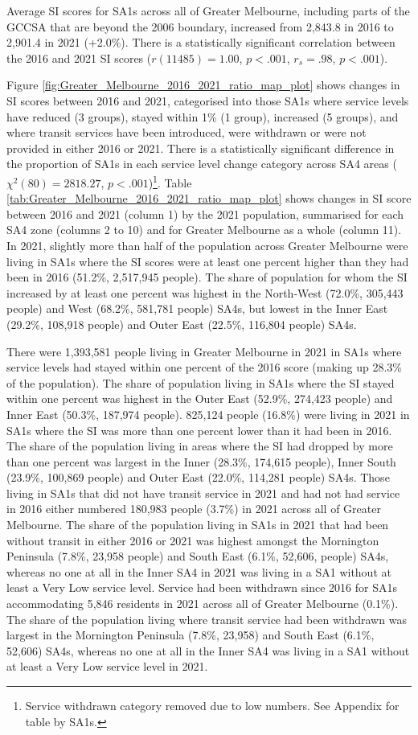 \documentclass[preprint, 3p,
authoryear]{elsarticle} %
\begin{document}
Average SI scores for SA1s across all of Greater Melbourne, including
parts of the GCCSA that are beyond the 2006 boundary, increased from
2,843.8 in 2016 to 2,901.4 in 2021 (+2.0\%). There is a statistically
significant correlation between the 2016 and 2021 SI scores
(\(r(11485) = 1.00\), \(p < .001\), \(r_s =.98\), \(p < .001\)).

Figure \ref{fig:Greater_Melbourne_2016_2021_ratio_map_plot} shows
changes in SI scores between 2016 and 2021, categorised into those SA1s
where service levels have reduced (3 groups), stayed within 1\% (1
group), increased (5 groups), and where transit services have been
introduced, were withdrawn or were not provided in either 2016 or 2021.
There is a statistically significant difference in the proportion of
SA1s in each service level change category across SA4 areas
(\(\chi^2(80) = 2818.27\), \(p < .001\))\footnote{Service withdrawn
  category removed due to low numbers. See Appendix for table by SA1s.}.
Table \ref{tab:Greater_Melbourne_2016_2021_ratio_map_plot} shows changes
in SI score between 2016 and 2021 (column 1) by the 2021 population,
summarised for each SA4 zone (columns 2 to 10) and for Greater Melbourne
as a whole (column 11). In 2021, slightly more than half of the
population across Greater Melbourne were living in SA1s where the SI
scores were at least one percent higher than they had been in 2016
(51.2\%, 2,517,945 people). The share of population for whom the SI
increased by at least one percent was highest in the North-West (72.0\%,
305,443 people) and West (68.2\%, 581,781 people) SA4s, but lowest in
the Inner East (29.2\%, 108,918 people) and Outer East (22.5\%, 116,804
people) SA4s.

There were 1,393,581 people living in Greater Melbourne in 2021 in SA1s
where service levels had stayed within one percent of the 2016 score
(making up 28.3\% of the population). The share of population living in
SA1s where the SI stayed within one percent was highest in the Outer
East (52.9\%, 274,423 people) and Inner East (50.3\%, 187,974 people).
825,124 people (16.8\%) were living in 2021 in SA1s where the SI was
more than one percent lower than it had been in 2016. The share of the
population living in areas where the SI had dropped by more than one
percent was largest in the Inner (28.3\%, 174,615 people), Inner South
(23.9\%, 100,869 people) and Outer East (22.0\%, 114,281 people) SA4s.
Those living in SA1s that did not have transit service in 2021 and had
not had service in 2016 either numbered 180,983 people (3.7\%) in 2021
across all of Greater Melbourne. The share of the population living in
SA1s in 2021 that had been without transit in either 2016 or 2021 was
highest amongst the Mornington Peninsula (7.8\%, 23,958 people) and
South East (6.1\%, 52,606, people) SA4s, whereas no one at all in the
Inner SA4 in 2021 was living in a SA1 without at least a Very Low
service level. Service had been withdrawn since 2016 for SA1s
accommodating 5,846 residents in 2021 across all of Greater Melbourne
(0.1\%). The share of the population living where transit service had
been withdrawn was largest in the Mornington Peninsula (7.8\%, 23,958)
and South East (6.1\%, 52,606) SA4s, whereas no one at all in the Inner
SA4 was living in a SA1 without at least a Very Low service level in
2021.
\end{document}
